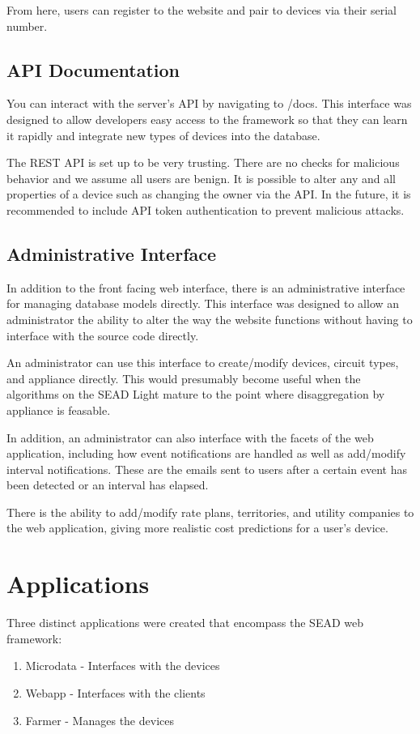 \documentclass[letterpaper,10pt,english]{sphinxmanual}
\begin{document}
From here, users can register to the website and pair to devices via their serial number.


\section{API Documentation}
\label{getting-started:api-documentation}
You can interact with the server's API by navigating to /docs. This interface was designed to allow developers easy access to the framework so that they can learn it rapidly and integrate new types of devices into the database.

The REST API is set up to be very trusting. There are no checks for malicious behavior and we assume all users are benign. It is possible to alter any and all properties of a device such as changing the owner via the API. In the future, it is recommended to include API token authentication to prevent malicious attacks.


\section{Administrative Interface}
\label{getting-started:administrative-interface}
In addition to the front facing web interface, there is an administrative interface for managing database models directly. This interface was designed to allow an administrator the ability to alter the way the website functions without having to interface with the source code directly.

An administrator can use this interface to create/modify devices, circuit types, and appliance directly. This would presumably become useful when the algorithms on the SEAD Light mature to the point where disaggregation by appliance is feasable.

In addition, an administrator can also interface with the facets of the web application, including how event notifications are handled as well as add/modify interval notifications. These are the emails sent to users after a certain event has been detected or an interval has elapsed.

There is the ability to add/modify rate plans, territories, and utility companies to the web application, giving more realistic cost predictions for a user's device.


\chapter{Applications}
\label{applications:applications}\label{applications::doc}\label{applications:id1}
Three distinct applications were created that encompass the SEAD web framework:
\begin{enumerate}
\item {} 
Microdata - Interfaces with the devices

\item {} 
Webapp - Interfaces with the clients

\item {} 
Farmer - Manages the devices

\end{enumerate}
\end{document}
